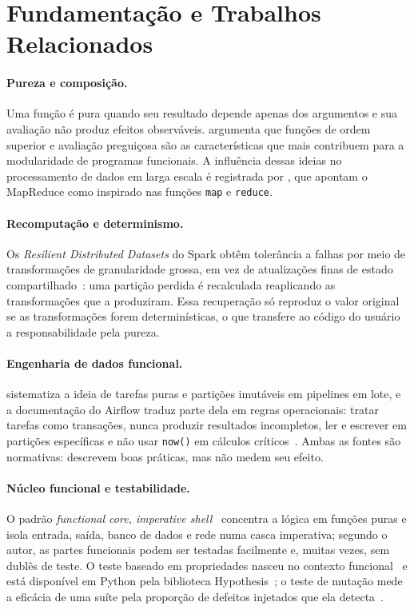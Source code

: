 \section{Fundamentação e Trabalhos Relacionados}

\paragraph{Pureza e composição.} Uma função é pura quando seu resultado depende apenas dos argumentos e sua avaliação não produz efeitos observáveis. \citet{hughes1989} argumenta que funções de ordem superior e avaliação preguiçosa são as características que mais contribuem para a modularidade de programas funcionais. A influência dessas ideias no processamento de dados em larga escala é registrada por \citet{hu2015}, que apontam o MapReduce como inspirado nas funções \texttt{map} e \texttt{reduce}.

\paragraph{Recomputação e determinismo.} Os \emph{Resilient Distributed Datasets} do Spark obtêm tolerância a falhas por meio de transformações de granularidade grossa, em vez de atualizações finas de estado compartilhado~\citep{zaharia2012}: uma partição perdida é recalculada reaplicando as transformações que a produziram. Essa recuperação só reproduz o valor original se as transformações forem determinísticas, o que transfere ao código do usuário a responsabilidade pela pureza.

\paragraph{Engenharia de dados funcional.} \citet{beauchemin2018} sistematiza a ideia de tarefas puras e partições imutáveis em pipelines em lote, e a documentação do Airflow traduz parte dela em regras operacionais: tratar tarefas como transações, nunca produzir resultados incompletos, ler e escrever em partições específicas e não usar \texttt{now()} em cálculos críticos~\citep{airflow2023}. Ambas as fontes são normativas: descrevem boas práticas, mas não medem seu efeito.

\paragraph{Núcleo funcional e testabilidade.} O padrão \emph{functional core, imperative shell}~\citep{bernhardt2012} concentra a lógica em funções puras e isola entrada, saída, banco de dados e rede numa casca imperativa; segundo o autor, as partes funcionais podem ser testadas facilmente e, muitas vezes, sem dublês de teste. O teste baseado em propriedades nasceu no contexto funcional~\citep{claessen2000} e está disponível em Python pela biblioteca Hypothesis~\citep{maciver2019}; o teste de mutação mede a eficácia de uma suíte pela proporção de defeitos injetados que ela detecta~\citep{jia2011}.

